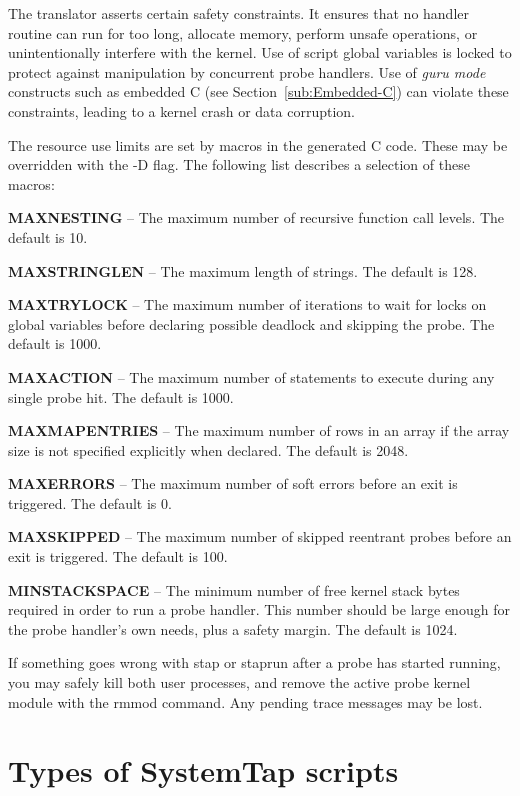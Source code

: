 \documentclass[twoside,english]{article}
\begin{document}
The translator asserts certain safety constraints. It
ensures that no handler routine can run for too long, allocate memory, perform
unsafe operations, or unintentionally interfere with the kernel. Use of script
global variables is locked to protect against manipulation by concurrent
probe handlers. Use of \emph{guru mode} constructs such as embedded C (see
Section~\ref{sub:Embedded-C}) can violate these constraints, leading to
a kernel crash or data corruption.

The resource use limits are set by macros in the generated C code. These
may be overridden with the -D flag. The following list describes a selection
of these macros:

\textbf{MAXNESTING} -- The maximum number of recursive function call levels. The default is 10.

\textbf{MAXSTRINGLEN} -- The maximum length of strings. The default is 128.

\textbf{MAXTRYLOCK} -- The maximum number of iterations to wait for locks on global variables before
declaring possible deadlock and skipping the probe. The default is 1000.

\textbf{MAXACTION} -- The maximum number of statements to execute during any single probe hit. The default is 1000.

\textbf{MAXMAPENTRIES} -- The maximum number of rows in an array if the array size is not specified
explicitly when declared. The default is 2048.

\textbf{MAXERRORS} -- The maximum number of soft errors before an exit is triggered. The default is 0.

\textbf{MAXSKIPPED} -- The maximum number of skipped reentrant probes before an exit is triggered. The default is 100.

\textbf{MINSTACKSPACE} -- The minimum number of free kernel stack bytes required in order to run a
probe handler. This number should be large enough for the probe handler's
own needs, plus a safety margin.  The default is 1024.

If something goes wrong with stap or staprun after a probe has started running,
you may safely kill both user processes, and remove the active probe kernel
module with the rmmod command. Any pending trace messages may be lost.

\section{Types of SystemTap scripts\label{sec:Types-of-SystemTap}}
\end{document}
